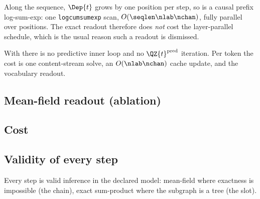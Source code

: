 Along the sequence, $\Dep{t}$ grows by one position per step, so  is a
causal prefix log-sum-exp: one \texttt{logcumsumexp} scan, $O(\seqlen \nlab \nchan)$, fully
parallel over positions. The exact readout therefore does \emph{not} cost the layer-parallel
schedule, which is the usual reason such a readout is dismissed.

\begin{remark}
\label{rmk:no-query-stream}
With  there is no predictive inner loop and no $\QZ{t}^{\mathrm{pred}}$
iteration. Per token the cost is one content-stream solve, an $O(\nlab\nchan)$ cache update,
and the vocabulary readout.
\end{remark}

\subsection{Mean-field readout (ablation)}
\label{sec:mfvi-readout}


\subsection{Cost}
\label{sec:cost}


\subsection{Validity of every step}
\label{sec:validity}

Every step is valid inference in the declared model: mean-field where exactness is impossible
(the chain), exact sum-product where the subgraph is a tree (the slot). 
